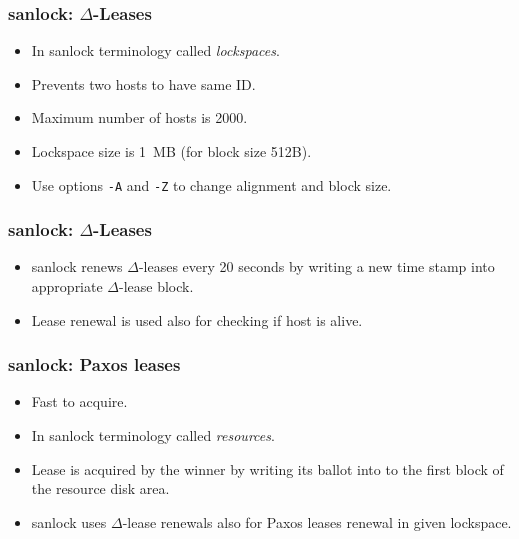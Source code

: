 \documentclass[10pt,utf8]{beamer}
\begin{document}
\begin{frame}
    \frametitle{sanlock: $\Delta$-Leases}
  \begin{itemize}
    \item In sanlock terminology called \textit{lockspaces}.
    \item Prevents two hosts to have same ID.
    \item Maximum number of hosts is 2000.
    \item Lockspace size is 1~MB (for block size 512B).
    \item Use options \texttt{-A} and \texttt{-Z} to change alignment and block size.
  \end{itemize}
\end{frame}

\begin{frame}
  \frametitle{sanlock: $\Delta$-Leases}
  \begin{itemize}
    \item sanlock renews $\Delta$-leases every 20 seconds by writing a new time stamp into appropriate $\Delta$-lease block.
    \item Lease renewal is used also for checking if host is alive.
  \end{itemize}
\end{frame}

\begin{frame}
  \frametitle{sanlock: Paxos leases}
  \begin{itemize}
    \item Fast to acquire.
    \item In sanlock terminology called \textit{resources}.
    \item Lease is acquired by the winner by writing its ballot into to the first block of the resource disk area.
    \item sanlock uses $\Delta$-lease renewals also for Paxos leases renewal in given lockspace.
  \end{itemize}
\end{frame}

\end{document}
